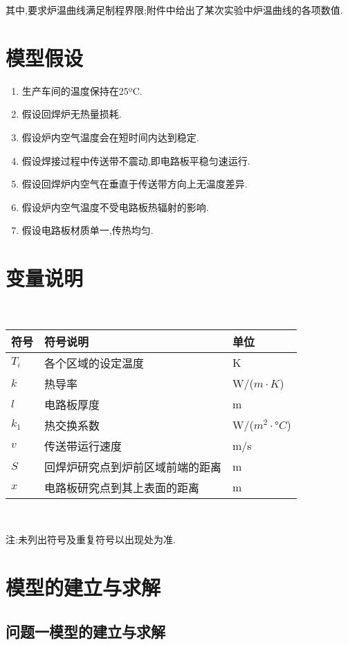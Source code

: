 \documentclass[12pt]{ctexart}
\numberwithin{figure}{section}
\numberwithin{table}{section}
\begin{document}
其中,要求炉温曲线满足制程界限;附件中给出了某次实验中炉温曲线的各项数值.
\section{模型假设}
\begin{enumerate}
\item 生产车间的温度保持在25ºC.
\item 假设回焊炉无热量损耗.
\item 假设炉内空气温度会在短时间内达到稳定.
\item 假设焊接过程中传送带不震动,即电路板平稳匀速运行.
\item 假设回焊炉内空气在垂直于传送带方向上无温度差异.
\item 假设炉内空气温度不受电路板热辐射的影响.
\item 假设电路板材质单一,传热均匀.
\end{enumerate}
\newpage
\section{变量说明}
\begin{longtable}
\centering
\setlength{\abovecaptionskip}{0pt}
     \caption{重要符号说明}
    \label{tab:表1}\\
   \begin{tabular}{m{2cm}<{\centering}m{10cm}<{\centering}m{3cm}<{\centering}}
    \toprule
    \textbf{符号}&\textbf{符号说明}&\textbf{单位}\\
    \midrule
    $T_i$&各个区域的设定温度&K\\
    $k$&热导率&W/($m\cdot K$)\\
    $l$&电路板厚度&m\\
    $k_1$&热交换系数&W/($m^2\cdot°C$)\\
    $v$&传送带运行速度&m/s\\
    $S$&回焊炉研究点到炉前区域前端的距离&m\\
    $x$&电路板研究点到其上表面的距离&m\\
        \bottomrule
    \end{tabular}\\
\end{longtable}
注:未列出符号及重复符号以出现处为准.
\section{模型的建立与求解}
\subsection{问题一模型的建立与求解}
\end{document}
